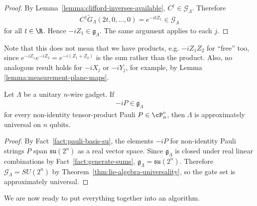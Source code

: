 \begin{proof}
By Lemma~\ref{lemma:clifford-inverses-available}, $C^\dagger \in \mathcal{G}_\Lambda$. Therefore
\begin{align}
    C^\dagger \widetilde{G}_\Lambda(2t,0,\ldots,0)
    =
    e^{-itZ_1}
    \in
    \mathcal{G}_\Lambda
\end{align}
for all $t \in \R$. Hence $-iZ_1 \in \mathfrak{g}_\Lambda$. The same argument applies to each $j$.
\end{proof}

Note that this does not mean that we have products, e.g. $-iZ_1Z_2$ for ``free'' too, since $e^{-iZ_1}e^{-iZ_2} = e^{-i(Z_1 + Z_2)}$ is the sum rather than the product. Also, no analogous result holds for $-iX_j$ or $-iY_j$, for example, by Lemma \ref{lemma:measurement-plane-maps}.

\begin{theorem}
\label{thm:gadget-universality-pauli-generation}
Let $\Lambda$ be a unitary $n$-wire gadget. If
\begin{align}
    -iP \in \mathfrak{g}_\Lambda
\end{align}
for every non-identity tensor-product Pauli $P \in \cP_n^\circ$, then $\Lambda$ is approximately universal on $n$ qubits.
\end{theorem}

\begin{proof}
By Fact~\ref{fact:pauli-basis-su}, the elements $-iP$ for non-identity Pauli strings $P$ span $\mathfrak{su}(2^n)$ as a real vector space. Since $\mathfrak{g}_\Lambda$ is closed under real linear combinations by Fact~\ref{fact:generate-sums},
$
    \mathfrak{g}_\Lambda
    =
    \mathfrak{su}(2^n).
$
Therefore $\mathcal{G}_\Lambda=SU(2^n)$ by Theorem~\ref{thm:lie-algebra-universality}, so the gate set is approximately universal.
\end{proof}

We are now ready to put everything together into an algorithm.

